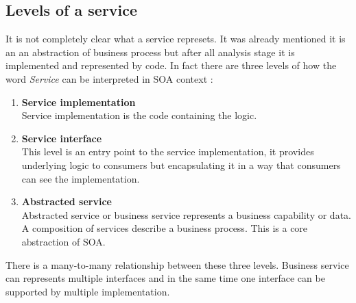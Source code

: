 \subsection{Levels of a service} 
\label{subsec:levels-of-service}

It is not completely clear what a service represets. It was already mentioned it is an an abstraction of business process but after all analysis stage it is implemented and represented by code.
In fact there are three levels of how the word \emph{Service} can be interpreted in SOA context \cite{agile-architecture}:
\begin{enumerate}
  \item \textbf{Service implementation} \hfill \\
Service implementation is the code containing the logic.
  \item \textbf{Service interface} \hfill \\ 
This level is an entry point to the service implementation, it provides underlying logic to consumers but encapsulating it in a way that consumers can see the implementation. 
  \item \textbf{Abstracted service} \hfill \\
Abstracted service or business service represents a business capability or data. A composition of services describe a business process. This is a core abstraction of SOA.
\end{enumerate}

There is a many-to-many relationship between these three levels. Business service can represents multiple interfaces and in the same time one interface can be supported by multiple implementation.




\bigskip

